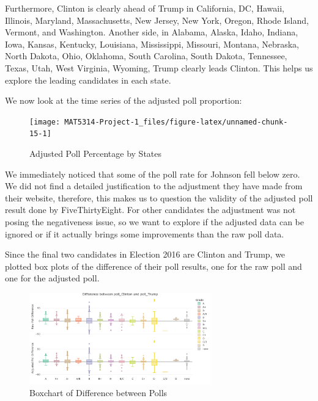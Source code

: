 \documentclass[
  12pt,
]{article}
\begin{document}
Furthermore, Clinton is clearly ahead of Trump in California, DC,
Hawaii, Illinois, Maryland, Massachusetts, New Jersey, New York, Oregon,
Rhode Island, Vermont, and Washington. Another side, in Alabama, Alaska,
Idaho, Indiana, Iowa, Kansas, Kentucky, Louisiana, Mississippi,
Missouri, Montana, Nebraska, North Dakota, Ohio, Oklahoma, South
Carolina, South Dakota, Tennessee, Texas, Utah, West Virginia, Wyoming,
Trump clearly leads Clinton. This helps us explore the leading
candidates in each state.

We now look at the time series of the adjusted poll proportion:

\begin{minipage}[t]{0.7\textwidth}
\begin{figure}
\texttt{[image: MAT5314-Project-1\_files/figure-latex/unnamed-chunk-15-1]} \caption{Adjusted Poll Percentage by States}\label{fig:unnamed-chunk-15}
\end{figure}
\end{minipage}
\begin{minipage}[t]{0.3\textwidth}
\vspace{0pt}
We immediately noticed that some of the poll rate for Johnson fell below zero. We did not find a detailed justification to the adjustment they have made from their website, therefore, this makes us to question the validity of the adjusted poll result done by FiveThirtyEight. For other candidates the adjustment was not posing the negativeness issue, so we want to explore if the adjusted data can be ignored or if it actually brings some improvements than the raw poll data.
\end{minipage}

Since the final two candidates in Election 2016 are Clinton and Trump,
we plotted box plots of the difference of their poll results, one for
the raw poll and one for the adjusted poll.

\begin{figure}
\centering
\includegraphics[width=0.7\textwidth,height=\textheight]{./Figures/boxchart.png}
\caption{Boxchart of Difference between Polls}
\end{figure}
\end{document}
